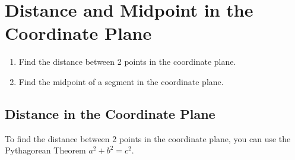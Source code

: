 \documentclass{article}
\begin{document}
\section*{Distance and Midpoint in the Coordinate Plane}

\begin{tcolorbox}[colframe=orange!70!white, coltitle=black, title=\textbf{Today I Can}]
\begin{enumerate}
    \item Find the distance between 2 points in the coordinate plane.
    \item Find the midpoint of a segment in the coordinate plane.
\end{enumerate}
\end{tcolorbox}

\subsection*{Distance in the Coordinate Plane}

To find the distance between 2 points in the coordinate plane, you can use the Pythagorean Theorem $a^2 + b^2 = c^2$.
\newline
\end{document}
